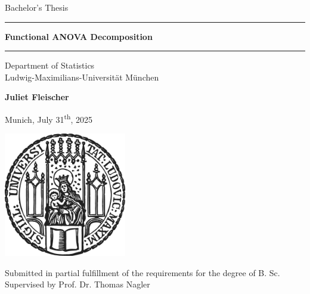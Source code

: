 \documentclass[12pt]{article}
\newcommand{\mytitle}{Functional ANOVA Decomposition}
\newcommand{\myname}{Juliet Fleischer}
\newcommand{\mysupervisor}{Prof. Dr. Thomas Nagler}
\begin{document}
 
\begin{titlepage}
\begin{center}
    
\LARGE
Bachelor's Thesis
    
\vspace{0.5cm}
      
\rule{\textwidth}{1.5pt}
\LARGE
\textbf{\mytitle}
\rule{\textwidth}{1.5pt}
   
\vspace{0.5cm}
      
\large
Department of Statistics \\
Ludwig-Maximilians-Universität München 

\vfill

\Large
\textbf{\myname}

\vfill

\large
Munich, July 31\textsuperscript{th}, 2025
      
\vfill

\includegraphics[width = 0.4\textwidth]{sigillum.png}

\vfill

\normalsize
Submitted in partial fulfillment of the requirements for the degree of B. Sc.
\\

Supervised by \mysupervisor

\end{center}
\end{titlepage}


\newpage
\end{document}
